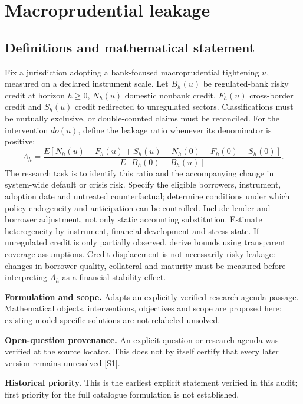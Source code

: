 \documentclass[11pt]{article}
\newcommand{\sref}[2]{\hyperlink{source:#1:#2}{[S#2]}}
\begin{document}
\section*{Macroprudential leakage}\label{30007605}
\subsection{Definitions and mathematical statement}
Fix a jurisdiction adopting a bank-focused macroprudential tightening \(u\), measured on a declared instrument scale. Let \(B_h(u)\) be regulated-bank risky credit at horizon \(h\geq0\), \(N_h(u)\) domestic nonbank credit, \(F_h(u)\) cross-border credit and \(S_h(u)\) credit redirected to unregulated sectors. Classifications must be mutually exclusive, or double-counted claims must be reconciled. For the intervention \(do(u)\), define the leakage ratio whenever its denominator is positive:
\[\Lambda_h=\frac{E[N_h(u)+F_h(u)+S_h(u)-N_h(0)-F_h(0)-S_h(0)]}{E[B_h(0)-B_h(u)]}.\]
The research task is to identify this ratio and the accompanying change in system-wide default or crisis risk. Specify the eligible borrowers, instrument, adoption date and untreated counterfactual; determine conditions under which policy endogeneity and anticipation can be controlled. Include lender and borrower adjustment, not only static accounting substitution. Estimate heterogeneity by instrument, financial development and stress state. If unregulated credit is only partially observed, derive bounds using transparent coverage assumptions. Credit displacement is not necessarily risky leakage: changes in borrower quality, collateral and maturity must be measured before interpreting \(\Lambda_h\) as a financial-stability effect.

\par\textbf{Formulation and scope.} Adapts an explicitly verified research-agenda passage. Mathematical objects, interventions, objectives and scope are proposed here; existing model-specific solutions are not relabeled unsolved.

\par\textbf{Open-question provenance.} An explicit question or research agenda was verified at the source locator. This does not by itself certify that every later version remains unresolved \sref{30007605}{1}.

\par\textbf{Historical priority.} This is the earliest explicit statement verified in this audit; first priority for the full catalogue formulation is not established.
\end{document}
